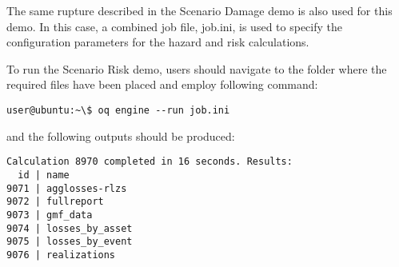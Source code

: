 The same rupture described in the Scenario Damage demo is also used for this
demo. In this case, a combined job file, job.ini, is used to specify the
configuration parameters for the hazard and risk calculations.

To run the Scenario Risk demo, users should navigate to the folder where the
required files have been placed and employ following command:

\begin{verbatim}
user@ubuntu:~\$ oq engine --run job.ini
\end{verbatim}

and the following outputs should be produced:

\begin{verbatim}
Calculation 8970 completed in 16 seconds. Results:
  id | name
9071 | agglosses-rlzs
9072 | fullreport
9073 | gmf_data
9074 | losses_by_asset
9075 | losses_by_event
9076 | realizations
\end{verbatim}

